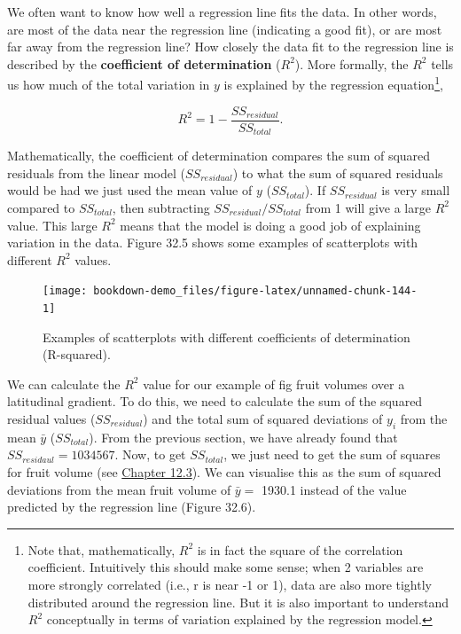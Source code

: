 \documentclass[
  openany]{krantz}
\begin{document}
We often want to know how well a regression line fits the data.
In other words, are most of the data near the regression line (indicating a good fit), or are most far away from the regression line?
How closely the data fit to the regression line is described by the \textbf{coefficient of determination} (\(R^{2}\)).
More formally, the \(R^{2}\) tells us how much of the total variation in \(y\) is explained by the regression equation\footnote{Note that, mathematically, \(R^{2}\) is in fact the square of the correlation coefficient. Intuitively this should make some sense; when 2 variables are more strongly correlated (i.e., r is near -1 or 1), data are also more tightly distributed around the regression line. But it is also important to understand \(R^{2}\) conceptually in terms of variation explained by the regression model.},

\[R^{2} = 1 - \frac{SS_{residual}}{SS_{total}}.\]

Mathematically, the coefficient of determination compares the sum of squared residuals from the linear model (\(SS_{residual}\)) to what the sum of squared residuals would be had we just used the mean value of \(y\) (\(SS_{total}\)).
If \(SS_{residual}\) is very small compared to \(SS_{total}\), then subtracting \(SS_{residual}/SS_{total}\) from 1 will give a large \(R^{2}\) value.
This large \(R^{2}\) means that the model is doing a good job of explaining variation in the data.
Figure 32.5 shows some examples of scatterplots with different \(R^{2}\) values.

\begin{figure}
\texttt{[image: bookdown-demo\_files/figure-latex/unnamed-chunk-144-1]} \caption{Examples of scatterplots with different coefficients of determination (R-squared).}\label{fig:unnamed-chunk-144}
\end{figure}

We can calculate the \(R^{2}\) value for our example of fig fruit volumes over a latitudinal gradient.
To do this, we need to calculate the sum of the squared residual values (\(SS_{residual}\)) and the total sum of squared deviations of \(y_{i}\) from the mean \(\bar{y}\) (\(SS_{total}\)).
From the previous section, we have already found that \(SS_{residaul} = 1034567\).
Now, to get \(SS_{total}\), we just need to get the sum of squares for fruit volume (see \protect\hyperlink{the-variance}{Chapter 12.3}).
We can visualise this as the sum of squared deviations from the mean fruit volume of \(\bar{y} =\) 1930.1 instead of the value predicted by the regression line (Figure 32.6).
\end{document}
